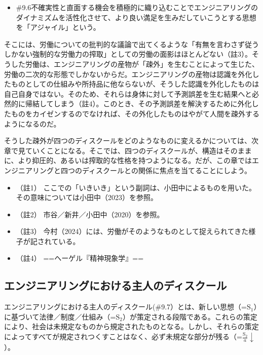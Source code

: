 \begin{note}{}
  \begin{itemize}
    \tightlist
    \item{\#9.6}不確実性と直面する機会を積極的に織り込むことでエンジニアリングのダイナミズムを活性化させて、より良い満足を生みだしていこうとする思想を「アジャイル」という。
  \end{itemize}
\end{note}

そこには、労働についての批判的な議論で出てくるような「有無を言わさず従うしかない強制的な労働力の搾取」としての労働の面影はほとんどない（註3）。そうした労働は、エンジニアリングの産物が「疎外」を生むことによって生じた、労働の二次的な形態でしかないからだ。エンジニアリングの産物は認識を外化したものとしての仕組みや所持品に他ならないが、そうした認識を外化したものは自己自身ではない。そのため、それらは身体に対して予測誤差を生む結果へと必然的に帰結してしまう（註4）。このとき、その予測誤差を解決するために外化したものをカイゼンするのでなければ、その外化したものはやがて人間を疎外するようになるのだ。

そうした疎外が四つのディスクールをどのようなものに変えるかについては、次章で見ていくことになる。そこでは、四つのディスクールが、構造はそのままに、より抑圧的、あるいは搾取的な性格を持つようになる。だが、この章ではエンジニアリングと四つのディスクールとの関係に焦点を当てることにしよう。

\begin{itemize}
\tightlist
\item
  （註1）
  ここでの「いきいき」という副詞は、小田中によるものを用いた。その意味については小田中（2023）\cite{Odanaka}を参照。
\item
  （註2） 市谷／新井／小田中（2020）\cite{IchitaniEtAl}を参照。
\item
  （註3）
  今村（2024）\cite{Imamura2}には、労働がそのようなものとして捉えられてきた様子が記されている。
\item
  （註4） ==ヘーゲル『精神現象学』==
\end{itemize}

\subsection{エンジニアリングにおける主人のディスクール}\label{ux30a8ux30f3ux30b8ux30cbux30a2ux30eaux30f3ux30b0ux306bux304aux3051ux308bux4e3bux4ebaux306eux30c7ux30a3ux30b9ux30afux30fcux30eb}

エンジニアリングにおける主人のディスクール(\#9.7）とは、新しい思想（=\(\textrm{S}_1\)）に基づいて法律／制度／仕組み（=\(\textrm{S}_2\)）が策定される段階である。これらの策定により、社会は未規定なものから規定されたものとなる。しかし、それらの策定によってすべてが規定されつくすことはなく、必ず未規定な部分が残る（=\(\frac{\textrm{S}_2}{a}\downarrow\)）。

